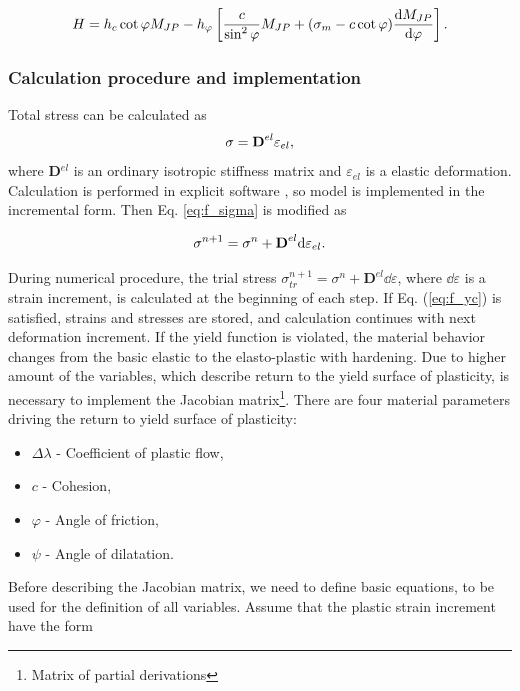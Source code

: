 \begin{equation}\label{eq:H_final}
	H = h_c \cot\varphi M_{JP} - h_\varphi \left[ \dfrac{c}{\sin^2 \varphi} M_{JP} + (\sigma_m - c \cot \varphi) \dv{M_{JP}}{\varphi} \right].
\end{equation}


\subsubsection{Calculation procedure and implementation}\label{sec:drucker-prager_count}
\indent
Total stress can be calculated as 
\begin{equation}\label{eq:f_sigma}
\sigma = \text{\textbf{D}}^{el} \varepsilon_{el},
\end{equation}
where \textbf{D}$^{el}$ is an ordinary isotropic stiffness matrix and $\varepsilon_{el}$ is a elastic deformation. Calculation is performed in explicit software \cite{mars}, so model is implemented in the incremental form. Then Eq. \ref{eq:f_sigma} is modified as

\begin{equation}\label{eq:f_sigma1}
	\sigma^{n+1} = \sigma^n+ \text{\textbf{D}}^{el} \mathrm{d} \varepsilon_{el}.
\end{equation}

During numerical procedure, the trial stress $ \sigma_{tr}^{n+1} = \sigma^n + \textbf{D}^{el}\dd\varepsilon$, where $\dd\varepsilon$ is a strain increment, is calculated at the beginning of each step. If Eq. (\ref{eq:f_yc}) is satisfied, strains and stresses are stored, and calculation continues with next deformation increment. If the yield function is violated, the material behavior changes from the basic elastic to the elasto-plastic with hardening. Due to higher amount of the variables, which describe return to the yield surface of plasticity, is necessary to implement the Jacobian matrix\footnote{Matrix of partial derivations}. There are four material parameters driving the return to yield surface of plasticity:

\begin{itemize}
	\item $\Delta\lambda$ - Coefficient of plastic flow,
	\item $c$ - Cohesion,
	\item  $\varphi$ - Angle of friction,
	\item $\psi$ - Angle of dilatation.
\end{itemize}

Before describing the Jacobian matrix, we need to define basic equations, to be used for the definition of all variables. Assume that the plastic strain increment have the form 

